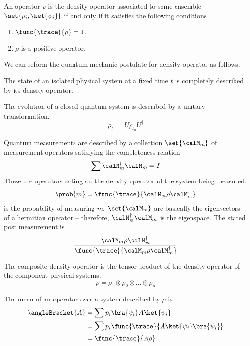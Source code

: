 \begin{theorem}
    An operator \(\rho\) is the density operator associated to some ensemble \(\set{p_i , \ket{\psi_i}}\) if and only if it satisfies the following conditions
    \begin{enumerate}
        \item \(\func{\trace}{\rho} = 1\).
        \item \(\rho\) is a positive operator.
    \end{enumerate}
\end{theorem}

We can reform the quantum mechanic postulate for density operator as follows.
\begin{definition}
    \item [Postulate I:] The state of an isolated physical system at a fixed time \(t\) is completely described by its density operator.
    \item [Postulate II:] The evolution of a closed quantum system is described by a unitary transformation.
    \begin{equation*}
        \rho_{t_1} = U \rho_{t_0} U^{\dagger}
    \end{equation*}
    
    \item [Postulate III:] Quantum measurements are described by a collection \(\set{\calM_m}\) of measurement operators satisfying the completeness relation
    \begin{equation*}
        \sum \calM_m^{\dagger} \calM_m = I
    \end{equation*}
    These are operators acting on the density operator of the system being measured.
    \begin{equation*}
        \prob{m} = \func{\trace}{\calM_m \rho \calM_m^{\dagger}}
    \end{equation*} 
    is the probability of measuring \(m\). \(\set{\calM_m}\) are basically the eigenvectors of a hermitian operator -- therefore, \(\calM_m^{\dagger} \calM_m \) is the eigenspace. The stated post measurement is 
    \begin{equation*}
        \dfrac{\calM_m \rho \calM_m^{\dagger}}{ \func{\trace}{\calM_m \rho \calM_m^{\dagger}}}
    \end{equation*}
    \item [Postulate IV:] The composite density operator is the tensor product of the density operator of the component physical  systems.
    \begin{equation*}
        \rho = \rho_1 \otimes \rho_2 \otimes \dots \otimes \rho_n
    \end{equation*}
\end{definition}

The mean of an operator over a system described by \(\rho\) is 
\begin{align*}
    \angleBracket{A} &= \sum p_i \bra{\psi_i} A \ket{\psi_i} \\
    &= \sum p_i \func{\trace}{A \ket{\psi_i} \bra{\psi_i}}\\
    &= \func{\trace}{A \rho}
\end{align*}